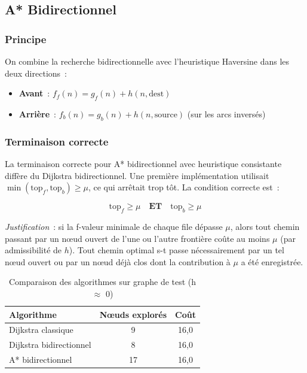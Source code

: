 \documentclass[a4paper, 12pt, twoside]{article}
\begin{document}
\subsection{A* Bidirectionnel}

\subsubsection{Principe}

On combine la recherche bidirectionnelle avec l'heuristique Haversine dans les deux directions~:
\begin{itemize}
  \item \textbf{Avant}~: $f_f(n) = g_f(n) + h(n, \text{dest})$
  \item \textbf{Arri\`{e}re}~: $f_b(n) = g_b(n) + h(n, \text{source})$ (sur les arcs invers\'{e}s)
\end{itemize}

\subsubsection{Terminaison correcte}

La terminaison correcte pour A* bidirectionnel avec heuristique consistante diff\`{e}re du Dijkstra bidirectionnel. Une premi\`{e}re impl\'{e}mentation utilisait $\min(\text{top}_f, \text{top}_b) \geq \mu$, ce qui arr\^{e}tait trop t\^{o}t. La condition correcte est~:

\[
\text{top}_{f} \geq \mu \quad \textbf{ET} \quad \text{top}_{b} \geq \mu
\]

\textit{Justification}~: si la f-valeur minimale de chaque file d\'{e}passe $\mu$, alors tout chemin passant par un n\oe ud ouvert de l'une ou l'autre fronti\`{e}re co\^{u}te au moins $\mu$ (par admissibilit\'{e} de $h$). Tout chemin optimal s-t passe n\'{e}cessairement par un tel n\oe ud ouvert ou par un n\oe ud d\'{e}j\`{a} clos dont la contribution \`{a} $\mu$ a \'{e}t\'{e} enregistr\'{e}e.

\begin{table}[h]
\begin{center}
\begin{tabular}{|l|c|c|}
\hline
\textbf{Algorithme} & \textbf{N\oe uds explor\'{e}s} & \textbf{Co\^{u}t} \\
\hline
Dijkstra classique & 9 & 16{,}0 \\
\hline
Dijkstra bidirectionnel & 8 & 16{,}0 \\
\hline
A* bidirectionnel & 17 & 16{,}0 \\
\hline
\end{tabular}
\end{center}
\caption{Comparaison des algorithmes sur graphe de test (h $\approx$ 0)}
\label{tab:astar}
\end{table}
\end{document}
